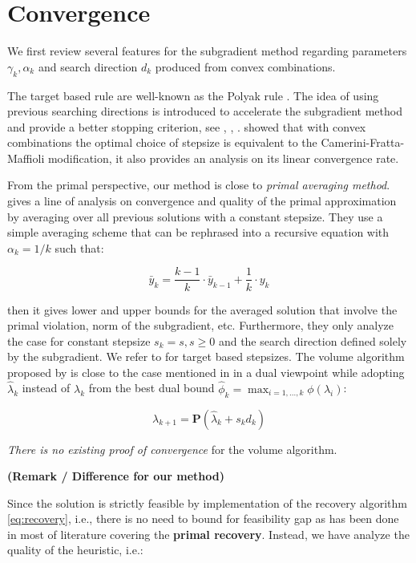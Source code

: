 \documentclass[../main]{subfiles}
\begin{document}
\section{Convergence}\label{convergence}


We first review several features for the subgradient method regarding
parameters \(\gamma_k, \alpha_k\) and search direction \(d_k\) produced from convex combinations.

The target based rule are well-known as the Polyak rule \cite{polyak_general_1967}.
The idea of using previous searching directions is introduced to accelerate the subgradient method and provide a better stopping criterion,
see \cite{camerini1975improving}, \cite{brannlund1995generalized}, \cite{barahona_volume_2000}.
\cite{brannlund1995generalized} showed that with convex combinations the optimal choice of stepsize is
equivalent to the Camerini-Fratta-Maffioli modification, it also provides an analysis on its linear convergence rate.

From the primal perspective, our method is close to \emph{primal
  averaging method}. \cite{nedic_approximate_2009}
gives a line of analysis on convergence and quality of the primal
approximation by averaging over all previous solutions with a constant
stepsize. They use a simple averaging scheme that can be rephrased into a
recursive equation with \(\alpha_k = 1/k\) such that:

\[\bar y_k = \frac{k-1}{k}\cdot\bar y_{k-1} + \frac{1}{k} \cdot y_k\]

then it gives lower and upper bounds for the averaged solution
that involve the primal violation, norm of the subgradient, etc. Furthermore, they only analyze the case for constant
stepsize \(s_k = s, s\ge 0\) and the search direction defined solely by
the subgradient. We refer to \cite{kiwiel_lagrangian_2007} for target based
stepsizes. The volume algorithm proposed by \cite{barahona_volume_2000} is close to the
case mentioned in \cite{brannlund1995generalized} in a dual
viewpoint while adopting \(\hat \lambda_{k}\) instead of \(\lambda_k\) from the best dual bound
\(\hat \phi_k = \max_{i=1, ..., k} \phi(\lambda_i)\):

\[\lambda_{k+1} = \mathbf{P}(\hat\lambda_{k} + s_{k}d_{k})\]

\emph{There is no existing proof of convergence} for the volume
algorithm.

\textbf{(Remark / Difference for our method)}

Since the solution is strictly feasible by implementation of the
recovery algorithm \ref{eq:recovery}, i.e., there is no need to bound for feasibility gap
as has been done in most of literature covering the \textbf{primal
  recovery}. Instead, we have analyze the quality of the heuristic, i.e.:
\end{document}
